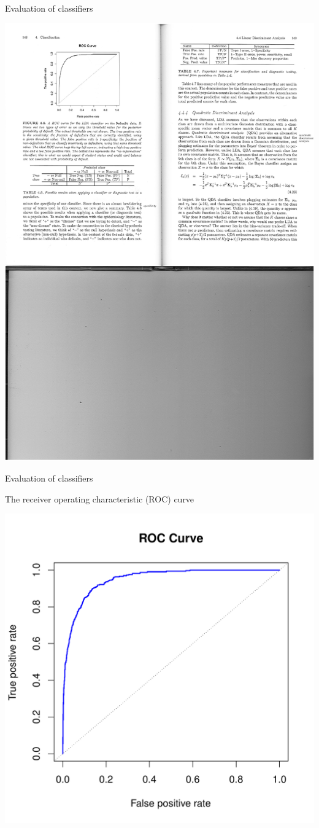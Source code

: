 \documentclass[14pt]{beamer}
\begin{document}
\begin{frame}{Evaluation of classifiers}
\centerline{\includegraphics[width=.7\textwidth]{Table7}}


\end{frame}


\begin{frame}{Evaluation of classifiers}

The receiver operating characteristic (ROC) curve

\centerline{\includegraphics[width=.6\textwidth]{4-8}}

\end{frame}

\end{document}
